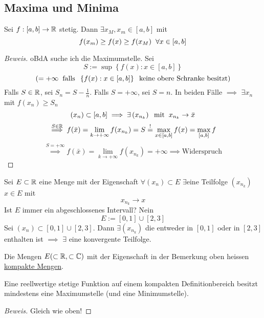 \subsection{Maxima und Minima}
\begin{Sat}
  Sei $f:[a,b]\to\mathbb{R}$ stetig. Dann $\exists x_M, x_m\in [a,b]$ mit
  \[f(x_m)\geq f(x)\geq f(x_M)\hspace{2mm}\forall x\in [a,b]\]
\end{Sat}
\begin{proof}[Beweis]
  oBdA suche ich die Maximumstelle. Sei
  \[S:=\sup \left\{ f(x):x\in\left[ a,b \right] \right\}\]
  \[(=+\infty\hspace{2mm}\text{falls}\hspace{2mm}\left\{ f(x):x\in\left[ a,b \right] \right\}\hspace{2mm}\text{keine obere Schranke besitzt)}\]
Falls $S\in\mathbb{R}$, sei $S_n=S-\frac{1}{n}$. Falls $S=+\infty$, sei
$S=n$. In beiden F\"alle $\implies$ $\exists x_n$ mit $f(x_n)\geq S_n$
  \[(x_n)\subset\left[ a,b \right]\implies\exists\left( x_{n_k} \right)\hspace{2mm}\text{mit}\hspace{2mm} x_{n_k}\to \bar x\]
  \[\stackrel{S\in \mathbb{R}}{\implies}f(\bar x)=\lim_{k\to+\infty}f(x_{n_k})=S\stackrel{!}{=}\max_{x\in\left[ a,b \right]}f(x)=\max_{\left[ a,b \right]} f\]
  \[\stackrel{S=+\infty}{\implies}f(\bar x)=\lim_{k\to +\infty}f(x_{n_k})=+\infty\implies \text{Widerspruch}\]
\end{proof}
\begin{Bem}
  Sei $E\subset\mathbb{R}$ eine Menge mit der Eigenschaft $\forall (x_n)\subset E$ $\exists$eine Teilfolge $(x_{n_k})$ $x\in E$ mit
  \[x_{n_k}\to x\]
  Ist $E$ immer ein abgeschlossenes Intervall? Nein
  \[E:=\left[ 0,1 \right]\cup \left[ 2,3 \right]\]
  Sei $(x_n)\subset\left[ 0,1 \right]\cup\left[ 2,3 \right]$. Dann $\exists\left( x_{n_k} \right)$ die entweder in $\left[ 0,1 \right]$ oder in $\left[ 2,3 \right]$ enthalten ist $\implies$ $\exists$ eine konvergente Teilfolge.
\end{Bem}
\begin{Def}
  Die Mengen $E(\subset\mathbb{R},\subset\mathbb{C})$ mit der Eigenschaft in der Bemerkung oben heissen \ul{kompakte Mengen}.
\end{Def}
\begin{Sat}
  Eine reellwertige stetige Funktion auf einem kompakten Definitionbereich besitzt mindestens eine Maximumstelle (und eine Minimumstelle).
\end{Sat}
\begin{proof}[Beweis] Gleich wie oben!
\end{proof}

